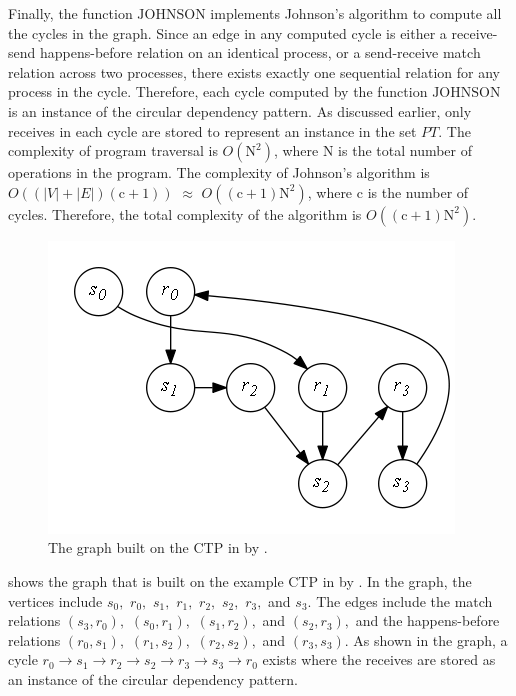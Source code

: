 Finally, the function $\mathrm{JOHNSON}$ implements Johnson's algorithm to compute all the cycles in the graph. Since an edge in any computed cycle is either a receive-send happens-before relation on an identical process, or a send-receive match relation across two processes, there exists exactly one sequential relation for any process in the cycle. Therefore, each cycle computed by the function $\mathrm{JOHNSON}$ is an instance of the circular dependency pattern. As discussed earlier, only receives in each cycle are stored to represent an instance in the set $\mathit{PT}$. The complexity of program traversal is $O(\mathrm{N}^2)$, where $\mathrm{N}$ is the total number of operations in the program. The complexity of Johnson's algorithm is $O((|V|+|E|)(\mathrm{c}+1))$ $\approx$ $O((\mathrm{c}+1)\mathrm{N}^2)$, where $\mathrm{c}$ is the number of cycles. Therefore, the total complexity of the algorithm is $O((\mathrm{c}+1)\mathrm{N}^2)$.

\begin{figure}[h]
\centering
\includegraphics[scale=0.45]{fig/circulardependencyGraph1.png}
\caption{The graph built on the CTP in  by .}
\label{fig:circulargraph}
\end{figure}

 shows the graph that is built on the example CTP in  by . 
In the graph, the vertices include $s_0,$ $r_0,$ $s_1,$ $r_1,$ $r_2,$ $s_2,$ $r_3,$ and $s_3$. The edges include the match relations $(s_3,r_0),$ $(s_0,r_1),$ $(s_1,r_2),$ and $(s_2,r_3),$ and the happens-before relations $(r_0,s_1),$ $(r_1,s_2),$ $(r_2,s_2),$ and $(r_3,s_3)$. 
As shown in the graph, a cycle $r_0\rightarrow s_1\rightarrow r_2\rightarrow s_2\rightarrow r_3\rightarrow s_3\rightarrow r_0$ exists where the receives are stored as an instance of the circular dependency pattern.

